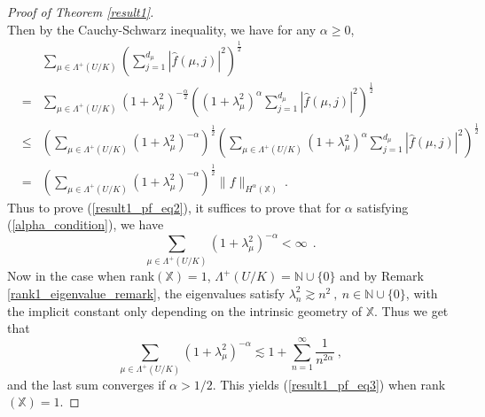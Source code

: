 \documentclass[12pt]{amsart}
\theoremstyle{definition}
\newcommand{\what}{\widehat}
\newcommand{\N}{\mathbb N}%
\newcommand{\X}{\mathbb X}%
\numberwithin{equation}{section}
\begin{document}
\begin{proof}[Proof of Theorem \ref{result1}]
\begin{equation*}
\end{equation*}
Then by the Cauchy-Schwarz inequality, we have for any $\alpha \ge 0$,
\begin{eqnarray*}
&&\sum_{\mu \in \Lambda^+(U/K)} \left(\sum_{j=1}^{d_\mu} \left|\what{f}(\mu,j)\right|^2\right)^{\frac{1}{2}}\\
&=& \sum_{\mu \in \Lambda^+(U/K)} {(1+\lambda^2_{\mu})}^{-\frac{\alpha}{2}} \left({(1+\lambda^2_{\mu})}^\alpha \sum_{j=1}^{d_\mu} \left|\what{f}(\mu,j)\right|^2\right)^{\frac{1}{2}} \\
& \le & \left(\sum_{\mu \in \Lambda^+(U/K)} {(1+\lambda^2_{\mu})}^{-\alpha}\right)^{\frac{1}{2}} \left(\sum_{\mu \in \Lambda^+(U/K)} {(1+\lambda^2_{\mu})}^\alpha \sum_{j=1}^{d_\mu} \left|\what{f}(\mu,j)\right|^2 \right)^{\frac{1}{2}} \\
&=& \left(\sum_{\mu \in \Lambda^+(U/K)} {(1+\lambda^2_{\mu})}^{-\alpha}\right)^{\frac{1}{2}} \|f\|_{H^\alpha(\X)}\:.
\end{eqnarray*}
Thus to prove (\ref{result1_pf_eq2}), it suffices to prove that for $\alpha$ satisfying (\ref{alpha_condition}), we have
\begin{equation} \label{result1_pf_eq3}
\sum_{\mu \in \Lambda^+(U/K)} {(1+\lambda^2_{\mu})}^{-\alpha} < \infty\:\:.
\end{equation}
Now in the case when rank$(\X)=1$, $\Lambda^+(U/K)=\N \cup \{0\}$ and by Remark \ref{rank1_eigenvalue_remark}, the eigenvalues satisfy $\lambda^2_n \gtrsim n^2\:,\: n \in \N \cup \{0\}$, with the implicit constant only depending on the intrinsic geometry of $\X$. Thus we get that
\begin{equation*}
\sum_{\mu \in \Lambda^+(U/K)} {(1+\lambda^2_{\mu})}^{-\alpha} \lesssim 1+\sum_{n=1}^\infty \frac{1}{n^{2\alpha}}\:,
\end{equation*}
and the last sum converges if $\alpha >1/2$. This yields (\ref{result1_pf_eq3}) when rank$(\X)=1$.

\medskip


\end{proof}
\end{document}
